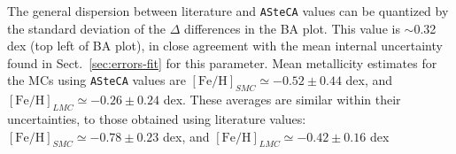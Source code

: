\documentclass[draft]{aa}
\begin{document}
%
%

The general dispersion between literature and \texttt{ASteCA} values can be
quantized by the standard deviation of the $\Delta$ differences in the BA plot.
This value is $\sim$0.32 dex (top left of BA plot), in close agreement with the
mean internal uncertainty found in Sect.~\ref{sec:errors-fit} for this
parameter. Mean metallicity estimates for the MCs using \texttt{ASteCA} values
are $\mathrm{[Fe/H]}_{SMC}{\simeq-}0.52{\pm}0.44$ dex, and
$\mathrm{[Fe/H]}_{LMC}{\simeq-}0.26{\pm}0.24$ dex. These averages are similar
within their uncertainties, to those obtained using literature values:
$\mathrm{[Fe/H]}_{SMC}{\simeq-}0.78{\pm}0.23$ dex, and
$\mathrm{[Fe/H]}_{LMC}{\simeq-}0.42{\pm}0.16$ dex\\
\end{document}
